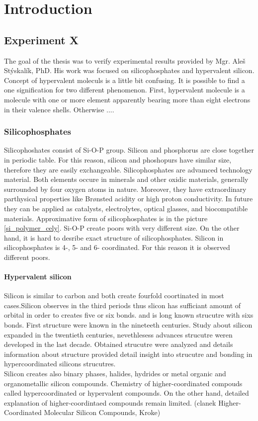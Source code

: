 \documentclass[
  digital, %
  table,   %
  lof,     %
  lot,     %
]{fithesis3}
\begin{document}
\chapter{Introduction}

\section{Experiment  X}
The goal of the thesis was to verify experimental results provided by Mgr. Aleš Stýskalík, PhD. His work was focused on silicophosphates and hypervalent silicon. Concept of hypervalent moleculs is a little bit confusing. It is possible to find a one signification for two different phenomenon. First, hypervalent molecule is a molecule with one or more element apparently bearing more than eight electrons in their valence shells. Otherwise ....
\subsection{Silicophosphates}
Silicophoshates consist of Si-O-P group. Silicon and phosphorus are close together in periodic table. For this reason, silicon and phoshopurs have similar size, therefore  they are easily exchangeable. Silicophosphates are advamced technology material. Both elements occure in minerals and other oxidic materials, generally surrounded by four oxygen atoms in nature. Moreover, they have extraordinary parthysical properties like Brønsted acidity or high proton conductivity. In future they can be applied as catalysts, electrolytes, optical glasses, and biocompatible materials. Approximative form of silicophosphates is in the picture \ref{si_polymer_cely}. \cite{Styskalik2015thesis} Si-O-P create poors with very different size. On the other hand, it is hard to desribe exact structure of silicophosphates. Silicon in silicophosphates is 4-, 5- and 6- coordinated. For this reason it is observed different poors.

\subsubsection{Hypervalent silicon}
Silicon is similar to carbon and both create fourfold coortinated in most cases.Silicon observes in the third periods thus slicon has sufficiant amount of orbital in order to creates five or six bonds.  and  is long known strucutre with sixs bonds. First structure were known in the nineteeth centuries. Study about silicon expanded in the twentieth centuries, nevethlesess advances strucutre weren developed in the last decade. Obtained strucutre were analyzed and details information about structure provided detail insight into strucutre and bonding in hypercoordinated silicons strucutres. \\
Silicon creates also binary phases, halides, hydrides or metal organic and organometallic silicon compounds. Chemistry of higher-coordinated compouds called hypercoordinated or hypervalent compounds. On the other hand, detailed explanation of higher-coordintaed compounds remain limited.
(clanek Higher-Coordinated Molecular Silicon
Compounds, Kroke)
\end{document}
